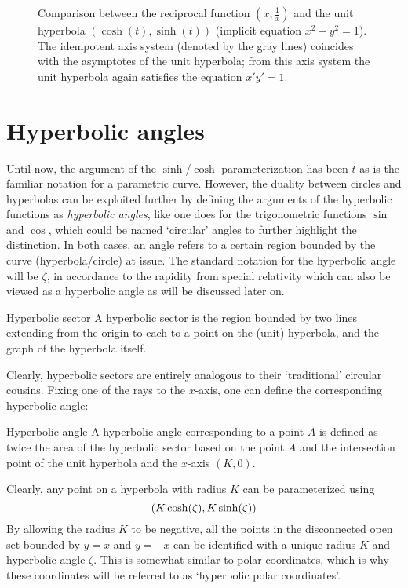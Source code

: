 \begin{figure}[ht]
    \centering
    
    \caption{Comparison between the reciprocal function $(x, \tfrac{1}{x})$ and the unit hyperbola $(\cosh(t), \sinh(t))$ (implicit equation $x^2 - y^2 = 1$). The idempotent axis system (denoted by the gray lines) coincides with the asymptotes of the unit hyperbola; from this axis system the unit hyperbola again satisfies the equation $x' y' = 1$.}
    \label{fig:hyperbola_comparison}
\end{figure}

\section{Hyperbolic angles}
Until now, the argument of the $\sinh$/$\cosh$ parameterization has been $t$ as is the familiar notation for a parametric curve. However, the duality between circles and hyperbolas can be exploited further by defining the arguments of the hyperbolic functions as \emph{hyperbolic angles}, like one does for the trigonometric functions $\sin$ and $\cos$, which could be named `circular' angles to further highlight the distinction. In both cases, an angle refers to a certain region bounded by the curve (hyperbola/circle) at issue. The standard notation for the hyperbolic angle will be $\zeta$, in accordance to the rapidity from special relativity which can also be viewed as a hyperbolic angle as will be discussed later on. 
\begin{block}{Hyperbolic sector}
A hyperbolic sector is the region bounded by two lines extending from the origin to each to a point on the (unit) hyperbola, and the graph of the hyperbola itself. 
\end{block}
Clearly, hyperbolic sectors are entirely analogous to their `traditional' circular cousins. Fixing one of the rays to the $x$-axis, one can define the corresponding hyperbolic angle:
\begin{block}{Hyperbolic angle}
A hyperbolic angle corresponding to a point $A$ is defined as twice the area of the hyperbolic sector based on the point $A$ and the intersection point of the unit hyperbola and the $x$-axis $(K, 0)$.
\end{block}
Clearly, any point on a hyperbola with radius $K$ can be parameterized using $$\qty(K\cosh(\zeta), K\sinh(\zeta))$$ By allowing the radius $K$ to be negative, all the points in the disconnected open set bounded by $y = x$ and $y = -x$ can be identified with a unique radius $K$ and hyperbolic angle $\zeta$. This is somewhat similar to polar coordinates, which is why these coordinates will be referred to as `hyperbolic polar coordinates'.

